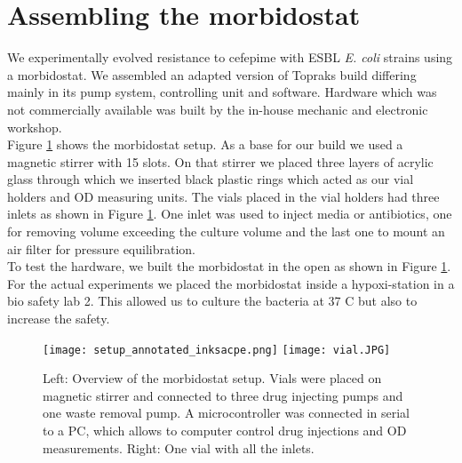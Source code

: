 \section{Assembling the morbidostat}
We experimentally evolved resistance to cefepime with ESBL \textit{E. coli} strains using a morbidostat. We assembled an adapted version of Topraks build differing mainly in its pump system, controlling unit and software\cite{toprak_building_2013}. Hardware which was not commercially available was built by the in-house mechanic and electronic workshop. \\
Figure \ref{figure:morbidostat_setup} shows the morbidostat setup.
As a base for our build we used a magnetic stirrer with 15 slots. On that stirrer we placed three layers of acrylic glass through which we inserted black plastic rings which acted as our vial holders and OD measuring units. 
The vials placed in the vial holders had three inlets as shown in Figure \ref{figure:morbidostat_setup}. One inlet was used to inject media or antibiotics, one for removing volume exceeding the culture volume and the last one to mount an air filter for pressure equilibration. \\
To test the hardware, we built the morbidostat in the open as shown in Figure \ref{figure:morbidostat_setup}. For the actual experiments we placed the morbidostat inside a hypoxi-station in a bio safety lab 2. This allowed us to culture the bacteria at 37 \degree C but also to increase the safety. 

\begin{figure}
	\texttt{[image: setup\_annotated\_inksacpe.png]}
	\texttt{[image: vial.JPG]}
	\caption{Left: Overview of the morbidostat setup. Vials were placed on magnetic stirrer and connected to three drug injecting pumps and one waste removal pump. A microcontroller was connected in serial to a PC, which allows to computer control drug injections and OD measurements. Right: One vial with all the inlets.}
	\label{figure:morbidostat_setup}
\end{figure}  


